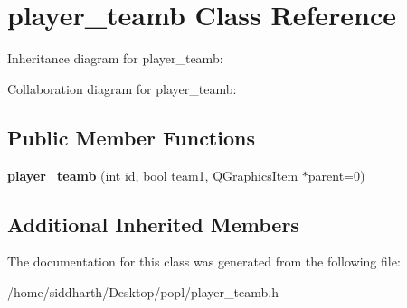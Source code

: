 \hypertarget{classplayer__teamb}{}\section{player\+\_\+teamb Class Reference}
\label{classplayer__teamb}


Inheritance diagram for player\+\_\+teamb\+:


Collaboration diagram for player\+\_\+teamb\+:
\subsection*{Public Member Functions}
\begin{DoxyCompactItemize}
\item 
{\bfseries player\+\_\+teamb} (int \hyperlink{classplayer_ae9ae277c4f56fd68e1251c4eb54ef5c5}{id}, bool team1, Q\+Graphics\+Item $\ast$parent=0)\hypertarget{classplayer__teamb_a306d6f45a9dcafe0fa7865cf4b47b5c0}{}\label{classplayer__teamb_a306d6f45a9dcafe0fa7865cf4b47b5c0}

\end{DoxyCompactItemize}
\subsection*{Additional Inherited Members}


The documentation for this class was generated from the following file\+:\begin{DoxyCompactItemize}
\item 
/home/siddharth/\+Desktop/popl/player\+\_\+teamb.\+h\end{DoxyCompactItemize}
